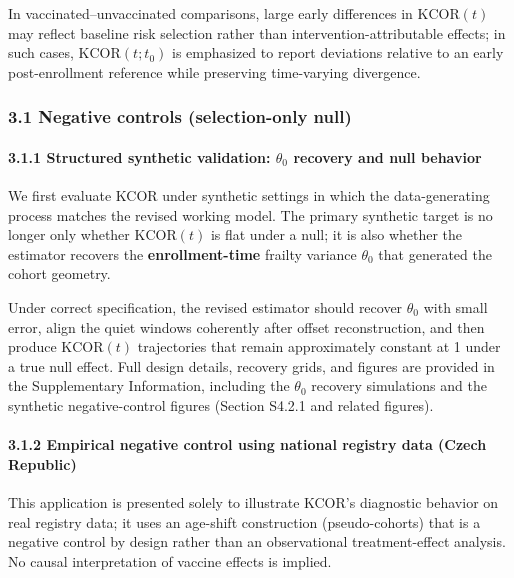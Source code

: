 \documentclass[
]{article}
\begin{document}
In vaccinated--unvaccinated comparisons, large early differences in
\(\mathrm{KCOR}(t)\) may reflect baseline risk selection rather than
intervention-attributable effects; in such cases,
\(\mathrm{KCOR}(t; t_0)\) is emphasized to report deviations relative to
an early post-enrollment reference while preserving time-varying
divergence.

\subsubsection{3.1 Negative controls (selection-only
null)}\label{negative-controls-selection-only-null}

\paragraph{\texorpdfstring{3.1.1 Structured synthetic validation:
\(\theta_0\) recovery and null
behavior}{3.1.1 Structured synthetic validation: \textbackslash theta\_0 recovery and null behavior}}\label{structured-synthetic-validation-theta_0-recovery-and-null-behavior}

We first evaluate KCOR under synthetic settings in which the
data-generating process matches the revised working model. The primary
synthetic target is no longer only whether \(\mathrm{KCOR}(t)\) is flat
under a null; it is also whether the estimator recovers the
\textbf{enrollment-time} frailty variance \(\theta_0\) that generated
the cohort geometry.

Under correct specification, the revised estimator should recover
\(\theta_0\) with small error, align the quiet windows coherently after
offset reconstruction, and then produce \(\mathrm{KCOR}(t)\)
trajectories that remain approximately constant at 1 under a true null
effect. Full design details, recovery grids, and figures are provided in
the Supplementary Information, including the \(\theta_0\) recovery
simulations and the synthetic negative-control figures (Section S4.2.1
and related figures).

\paragraph{3.1.2 Empirical negative control using national registry data
(Czech
Republic)}\label{empirical-negative-control-using-national-registry-data-czech-republic}

This application is presented solely to illustrate KCOR's diagnostic
behavior on real registry data; it uses an age-shift construction
(pseudo-cohorts) that is a negative control by design rather than an
observational treatment-effect analysis. No causal interpretation of
vaccine effects is implied.
\end{document}

